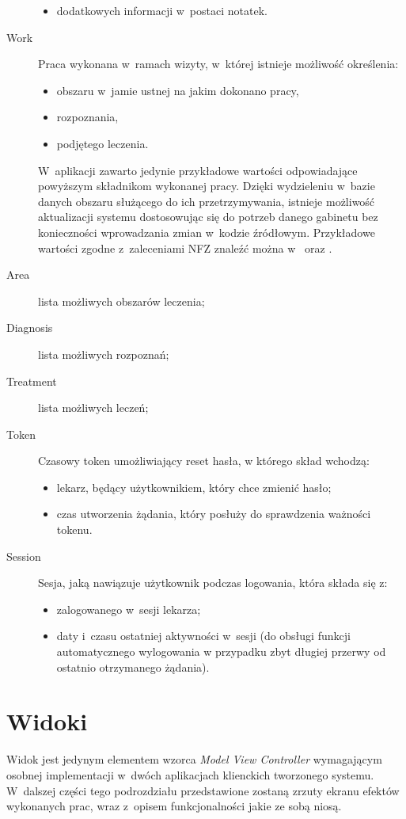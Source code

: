 \documentclass[11pt]{aghdpl}
\begin{document}
\begin{description}
\begin{itemize}
		\item dodatkowych informacji w~postaci notatek.
	\end{itemize}
\item[Work]
	Praca wykonana w~ramach wizyty, w~której istnieje możliwość określenia:
	\begin{itemize}
		\item obszaru w~jamie ustnej na jakim dokonano pracy,
		\item rozpoznania,
		\item podjętego leczenia.
	\end{itemize}
	W~aplikacji zawarto jedynie przykładowe wartości odpowiadające powyższym składnikom wykonanej pracy. Dzięki wydzieleniu w~bazie danych obszaru służącego do ich przetrzymywania, istnieje możliwość aktualizacji systemu dostosowując się do potrzeb danego gabinetu bez konieczności wprowadzania zmian w~kodzie źródłowym. Przykładowe wartości zgodne z~zaleceniami NFZ znaleźć można w~\cite{DzU13} oraz \cite{ICD9}.
\item[Area]
	lista możliwych obszarów leczenia;
\item[Diagnosis]
	lista możliwych rozpoznań;
\item[Treatment]
	lista możliwych leczeń;
\item[Token]
	Czasowy token umożliwiający reset hasła, w którego skład wchodzą:
	\begin{itemize}
		\item lekarz, będący użytkownikiem, który chce zmienić hasło;
		\item czas utworzenia żądania, który posłuży do sprawdzenia ważności tokenu.
	\end{itemize}
\item[Session]
	Sesja, jaką nawiązuje użytkownik podczas logowania, która składa się z:
	\begin{itemize}
		\item zalogowanego w~sesji lekarza;
		\item daty i~czasu ostatniej aktywności w~sesji (do obsługi funkcji automatycznego wylogowania w przypadku zbyt długiej przerwy od ostatnio otrzymanego żądania).
	\end{itemize}
\end{description}

\section{Widoki}

Widok jest jedynym elementem wzorca \emph{Model View Controller} wymagającym osobnej implementacji w~dwóch aplikacjach klienckich tworzonego systemu. W~dalszej części tego podrozdziału przedstawione zostaną zrzuty ekranu efektów wykonanych prac, wraz z~opisem funkcjonalności jakie ze sobą niosą.
\end{document}
